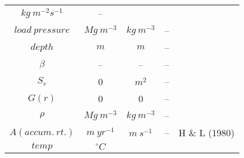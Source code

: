 \documentclass[a4paper,11pt]{article}
\begin{document}
\begin{longtable}{|c|c|c|c|c|}
\begin{math}kg \: m^{-2} s^{-1} \end{math} &
-- & \\
\cline{1-4}
\begin{math} load \: pressure\end{math} &
\begin{math} Mg \: m^{-3}\end{math} &
\begin{math} kg \: m^{-3}\end{math} &
-- & \\
\cline{1-4}
\begin{math} depth \end{math} &
\begin{math} m \end{math} &
\begin{math} m \end{math} &
-- & \\
\cline{1-4}
\begin{math} \beta \end{math} &
-- &
-- &
-- & \\
\cline{1-4}
\begin{math} S_v \end{math} &
0 &
\begin{math} m^2 \end{math} &
-- & \\
\cline{1-4}
\begin{math} G(r) \end{math} &
0 &
0 &
-- &  \\
\hline
\begin{math} \rho \end{math} &
\begin{math} Mg \: m^{-3}\end{math} &
\begin{math} kg  \: m^{-3}\end{math} &
-- & \\
\cline{1-4}
\begin{math}A(accum. \: rt.)\end{math} &
\begin{math} m \: yr^{-1}\end{math} &
\begin{math} m \: s^{-1}\end{math} &
-- & 
H \& L (1980) \cite{herron_firn}\\
\cline{1-4}
\begin{math}temp\end{math} &
\begin{math} ^\circ C\end{math} &

\end{longtable}
\end{document}
